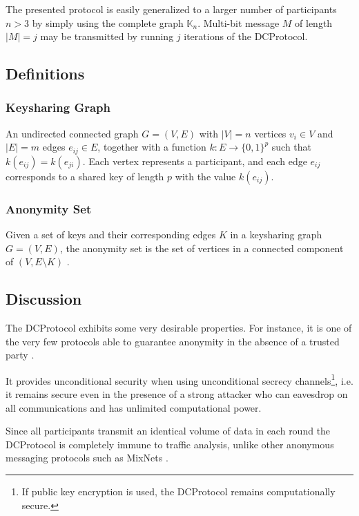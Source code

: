 The presented protocol is easily generalized to a larger number of participants $n > 3$ by simply
using the complete graph $\mathbb{K}_n$. Multi-bit message $M$ of length $|M| = j$
may be transmitted by running $j$ iterations of the \ac{DCProtocol}.  

\subsection{Definitions}

\subsubsection{Keysharing Graph}

An undirected connected graph $G = (V, E)$ with $|V| = n$ vertices $v_i \in V$ and $|E| = m$ edges $e_{ij} \in E$,
together with a function $k: E \rightarrow \{0, 1\}^p$ such that $k(e_{ij}) = k(e_{ji})$.
Each vertex represents a participant, and each edge $e_{ij}$ corresponds to a shared key of length $p$ with the value
$k(e_{ij})$.

\subsubsection{Anonymity Set}

Given a set of keys and their corresponding edges $K$ in a keysharing graph $G = (V, E)$, the anonymity set is the set of vertices in a connected component of $(V, E \setminus K)$ \cite{journals/joc/Chaum88}.


\subsection{Discussion}

The \ac{DCProtocol} exhibits some very desirable properties. For instance, it is one of the very few
protocols able to guarantee anonymity in the absence of a trusted party \cite{juels2004dining}.

It provides unconditional security when using unconditional secrecy channels\footnote{
If public key encryption is used, the \ac{DCProtocol} remains computationally secure.},
i.e. it remains secure even in the presence of a
strong attacker who can eavesdrop on all communications and has unlimited computational power.

Since all participants transmit an identical volume of data in each round the \ac{DCProtocol}
is completely immune to traffic analysis, unlike other anonymous messaging protocols such
as \acp{MixNet} \cite{journals/cacm/Chaum81}.

